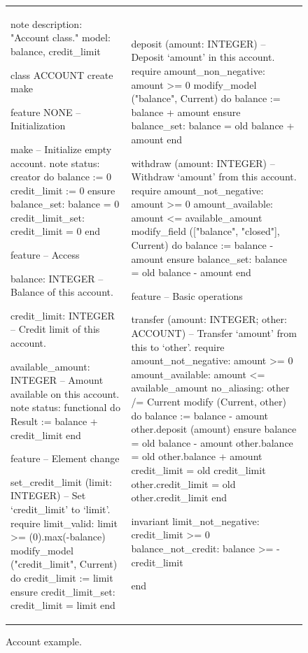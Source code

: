 \documentclass[a4paper,12pt]{article}
\begin{document}
\begin{figure}
\begin{tabular}{ll}
{\begin{erunning}[basicstyle=\scriptsize,numbers=left]
note
	description: "Account class."
	model: balance, credit_limit

class ACCOUNT
create make

feature {NONE} -- Initialization

	make
			-- Initialize empty account.
		note
			status: creator
		do
			balance := 0
			credit_limit := 0
		ensure
			balance_set: balance = 0
			credit_limit_set: credit_limit = 0
		end

feature -- Access

	balance: INTEGER
			-- Balance of this account.

	credit_limit: INTEGER
			-- Credit limit of this account.

	available_amount: INTEGER
			-- Amount available on this account.
		note status: functional
		do
			Result := balance + credit_limit
		end

feature -- Element change

	set_credit_limit (limit: INTEGER)
			-- Set `credit_limit' to `limit'.
		require
			limit_valid: limit >= (0).max(-balance)
			modify_model ("credit_limit", Current)
		do
			credit_limit := limit
		ensure
			credit_limit_set: credit_limit = limit
		end
\end{erunning}}
&
\hspace{4mm}
{\begin{erunning}[basicstyle=\scriptsize,numbers=left,firstnumber=last]

	deposit (amount: INTEGER)
			-- Deposit `amount' in this account.
		require
			amount_non_negative: amount >= 0
			modify_model ("balance", Current)
		do
			balance := balance + amount
		ensure
			balance_set: balance = old balance + amount
		end

	withdraw (amount: INTEGER)
			-- Withdraw `amount' from this account.
		require
			amount_not_negative: amount >= 0
			amount_available: amount <= available_amount
			modify_field (["balance", "closed"], Current)
		do
			balance := balance - amount
		ensure
			balance_set: balance = old balance - amount
		end

feature -- Basic operations

	transfer (amount: INTEGER; other: ACCOUNT)
			-- Transfer `amount' from this to `other'.
		require
			amount_not_negative: amount >= 0
			amount_available: amount <= available_amount
			no_aliasing: other /= Current
			modify (Current, other)
		do
			balance := balance - amount
			other.deposit (amount)
		ensure
			balance = old balance - amount
			other.balance = old other.balance + amount
			credit_limit = old credit_limit
			other.credit_limit = old other.credit_limit
		end

invariant
	limit_not_negative: credit_limit >= 0
	balance_not_credit: balance >= -credit_limit

end
\end{erunning}}
\end{tabular}
\caption{Account example.}
\label{code:account}
\end{figure}
\end{document}
